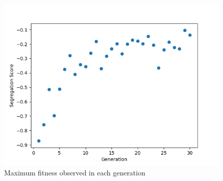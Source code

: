 \begin{figure}
    \centering
    \includegraphics[width=\linewidth]{imgs/fitness_search.png}
    \caption{Maximum fitness observed in each generation}
    \label{fig:fitness_search}
\end{figure}
